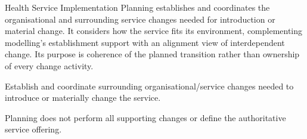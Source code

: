 Health Service Implementation Planning establishes and coordinates the organisational and surrounding service changes needed for introduction or material change. It considers how the service fits its environment, complementing modelling's establishment support with an alignment view of interdependent change. Its purpose is coherence of the planned transition rather than ownership of every change activity.



Establish and coordinate surrounding organisational/\allowbreak{}service changes needed to introduce or materially change the service.



Planning does not perform all supporting changes or define the authoritative service offering.


